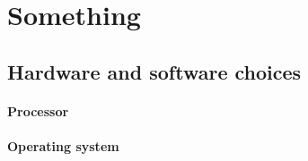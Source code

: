 \chapter{Something}

\section{Hardware and software choices}

\subsubsection{Processor}

\subsubsection{Operating system}
